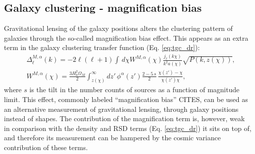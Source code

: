 \documentclass[twocolumn,amsfont,amssymb,amsmath, showpacs,balancelastpage, nofootinbib]{revtex4-1}
\begin{document}
  \subsection{Galaxy clustering - magnification bias}\label{ssec:results.mag}  
%      
    Gravitational lensing of the galaxy positions alters the clustering pattern of galaxies through the so-called magnification bias effect. This appears as an extra term in the galaxy clustering transfer function (Eq. \ref{eq:tgc_dr}):
    \begin{align}\nonumber
      &\Delta^{M,\alpha}_\ell(k)=-2\ell(\ell+1)\int\,d\chi W^{M,\alpha}(\chi)\frac{j_\ell(k\chi)}{k^2a(\chi)}\sqrt{P(k,z(\chi))},\\
      &W^{M,\alpha}(\chi)=\frac{3H_0^2\Omega_M}{2}\int_{z(\chi)}^\infty dz'\,\phi^\alpha(z')\frac{2-5\,s}{2}\,\frac{\chi(z')-\chi}{\chi(z')\chi},
    \end{align}
    where $s$ is the tilt in the number counts of sources as a function of magnitude limit. This effect, commonly labeled ``magnification bias'' CITES, can be used as an alternative measurement of gravitational lensing, through galaxy positions instead of shapes. The contribution of the magnification term is, however, weak in comparison with the density and RSD terms (Eq. \ref{eq:tgc_dr}) it sits on top of, and therefore its measurement can be hampered by the cosmic variance contribution of these terms.
    
\end{document}
